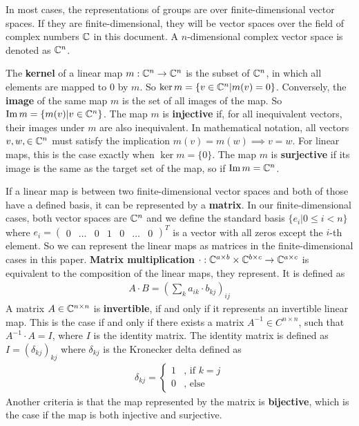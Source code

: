 In most cases, the representations of groups are over finite-dimensional vector spaces.
If they are finite-dimensional, they will be vector spaces over the field of complex numbers $\mathbb{C}$ in this document.
A $n$-dimensional complex vector space is denoted as $\mathbb{C}^n$.

The \textbf{kernel} of a linear map $m: \mathbb{C}^n \to \mathbb{C}^n$ is the subset of $\mathbb{C}^n$, in which all elements are mapped to $0$ by $m$.
So $\ker m = \{v \in \mathbb{C}^n | m(v) = 0\}$.
Conversely, the \textbf{image} of the same map $m$ is the set of all images of the map.
So $\operatorname{Im} m = \{m(v) | v \in \mathbb{C}^n\}$.
The map $m$ is \textbf{injective} if, for all inequivalent vectors, their images under $m$ are also inequivalent.
In mathematical notation, all vectors $v, w, \in \mathbb{C}^n$ must satisfy the implication $m(v) = m(w) \implies v = w$.
For linear maps, this is the case exactly when $\ker m = \{0\}$.
The map $m$ is \textbf{surjective} if its image is the same as the target set of the map, so if $\operatorname{Im} m = \mathbb{C}^n$.

If a linear map is between two finite-dimensional vector spaces and both of those have a defined basis, it can be represented by a \textbf{matrix}.
In our finite-dimensional cases, both vector spaces are $\mathbb{C}^n$ and we define the standard basis $\{e_i | 0 \leq i < n\}$ where $e_i = \begin{pmatrix} 0 & \ldots & 0 & 1 & 0 & \ldots & 0 \end{pmatrix}^T$ is a vector with all zeros except the $i$-th element.
So we can represent the linear maps as matrices in the finite-dimensional cases in this paper.
\textbf{Matrix multiplication} $\cdot: \mathbb{C}^{a \times b} \times \mathbb{C}^{b \times c} \to \mathbb{C}^{a \times c}$ is equivalent to the composition of the linear maps, they represent.
It is defined as
\begin{align}
    A \cdot B = \left(\sum_k a_{ik} \cdot b_{kj}\right)_{ij}
\end{align}
A matrix $A \in \mathbb{C}^{n \times n}$ is \textbf{invertible}, if and only if it represents an invertible linear map.
This is the case if and only if there exists a matrix $A^{-1} \in C^{n \times n}$, such that $A^{-1} \cdot A = I$, where $I$ is the identity matrix. 
The identity matrix is defined as $I = (\delta_{kj})_{kj}$ where $\delta_{kj}$ is the Kronecker delta defined as
\begin{align}
    \delta_{kj} = \begin{cases}
        1 & \text{, if } k = j \\
        0 & \text{, else}
    \end{cases}
\end{align}
Another criteria is that the map represented by the matrix is \textbf{bijective}, which is the case if the map is both injective and surjective.

